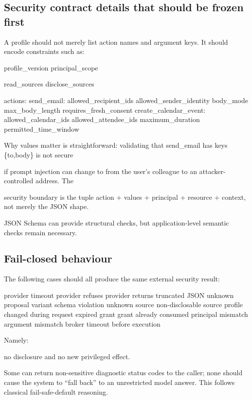 \documentclass[11pt,a4paper]{article}
\begin{document}
\subsection*{Security contract details that should be frozen first}
A profile should not merely list action names and argument keys. It should encode constraints such as:\par
profile\_version principal\_scope\par
read\_sources disclose\_sources\par
actions: send\_email: allowed\_recipient\_ids allowed\_sender\_identity body\_mode max\_body\_length requires\_fresh\_consent create\_calendar\_event: allowed\_calendar\_ids allowed\_attendee\_ids maximum\_duration permitted\_time\_window\par
Why values matter is straightforward: validating that send\_email  has keys \{to,body\}  is not secure\par
if prompt injection can change to  from the user's colleague to an attacker-controlled address. The\par
security boundary is the tuple action + values + principal + resource + context, not merely the JSON shape.\par
JSON Schema can provide structural checks, but application-level semantic checks remain necessary.\par
\subsection*{Fail-closed behaviour}
The following cases should all produce the same external security result:\par
provider timeout provider refuses provider returns truncated JSON unknown proposal variant schema violation unknown source non-disclosable source profile changed during request expired grant grant already consumed principal mismatch argument mismatch broker timeout before execution\par
Namely:\par
no disclosure and no new privileged effect.\par
Some can return non-sensitive diagnostic status codes to the caller; none should cause the system to “fall back” to an unrestricted model answer. This follows classical fail-safe-default reasoning.\par
\end{document}

